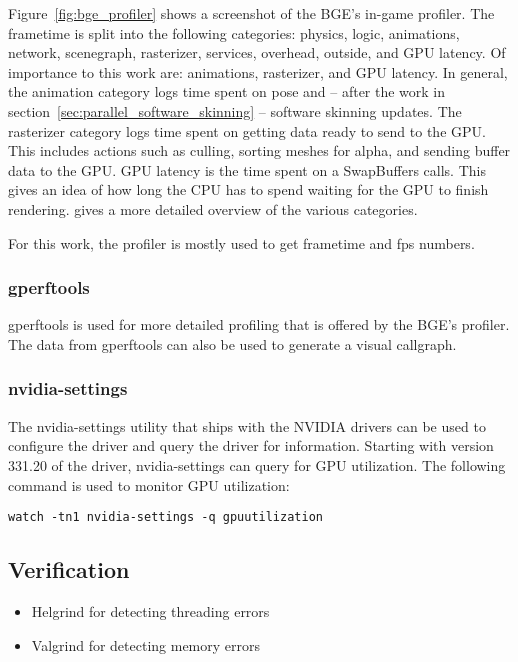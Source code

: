 Figure~\ref{fig:bge_profiler} shows a screenshot of the BGE's in-game profiler.
The frametime is split into the following categories: physics, logic, animations, network, scenegraph, rasterizer, services, overhead, outside, and GPU latency.
Of importance to this work are: animations, rasterizer, and GPU latency.
In general, the animation category logs time spent on pose and -- after the work in section~\ref{sec:parallel_software_skinning} -- software skinning updates.
The rasterizer category logs time spent on getting data ready to send to the GPU.
This includes actions such as culling, sorting meshes for alpha, and sending buffer data to the GPU.
GPU latency is the time spent on a SwapBuffers calls.
This gives an idea of how long the CPU has to spend waiting for the GPU to finish rendering.
\cite{bge_profile_stats} gives a more detailed overview of the various categories.

For this work, the profiler is mostly used to get frametime and fps numbers.

\subsubsection{gperftools}
gperftools\cite{gperftools} is used for more detailed profiling that is offered by the BGE's profiler.
The data from gperftools can also be used to generate a visual callgraph.

\subsubsection{nvidia-settings}
The nvidia-settings utility that ships with the NVIDIA drivers can be used to configure the driver and query the driver for information.
Starting with version 331.20 of the driver, nvidia-settings can query for GPU utilization\cite{nvidia331.20}.
The following command is used to monitor GPU utilization:

\begin{center}
 \texttt{watch -tn1 nvidia-settings -q gpuutilization}
\end{center}

\subsection{Verification}
\ifsummaries
\begin{itemize}
 \item Helgrind for detecting threading errors
 \item Valgrind for detecting memory errors
\end{itemize}
\fi

